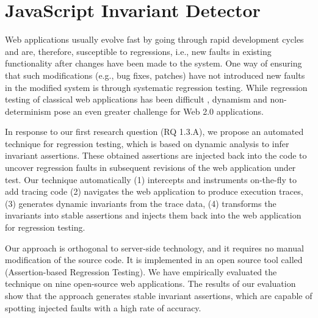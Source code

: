 \chapter{JavaScript Invariant Detector}
\label{Chap:jsart}
Web applications usually evolve fast by going through rapid development cycles and are, therefore, susceptible to regressions, i.e., new faults in existing functionality after changes have been made to the system. One way of ensuring that such modifications (e.g., bug fixes, patches) have not introduced new faults in the modified system is through systematic regression testing.
While regression testing of classical web applications
has been difficult \cite{tarhini:reg08}, dynamism and non-determinism pose an even greater challenge \cite{Roest:2010.icst} for Web 2.0 applications.

In response to our first research question (RQ 1.3.A), we propose an automated technique for \javascript regression testing, which is based on dynamic analysis to infer invariant assertions. These obtained assertions are injected back into the \javascript code to uncover regression faults in subsequent revisions of the web application under test. 
Our technique automatically (1) intercepts and instruments \javascript on-the-fly to add tracing code (2) navigates the web application to produce execution traces, (3) generates dynamic invariants from the trace data, (4) transforms the invariants into stable assertions and injects them back into the web application for regression testing.

Our approach is orthogonal to server-side technology, and it requires no manual modification of the source code. It is implemented in an open source tool called \jsart (\javascript Assertion-based Regression Testing).  We have empirically
evaluated the technique on nine open-source web applications. The results of our evaluation show that the approach generates stable invariant assertions, which are capable of spotting injected faults with a high rate of accuracy.





%
